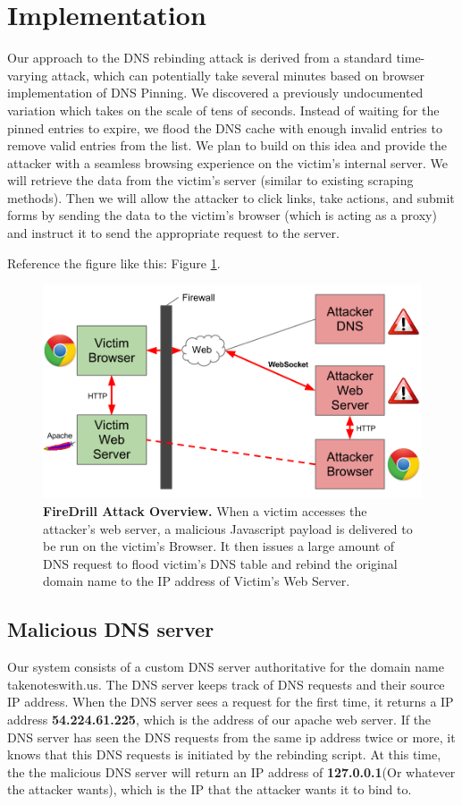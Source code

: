 \section{Implementation}
\label{sec:impl}
Our approach to the DNS rebinding attack is derived from a standard time-varying attack, which can potentially take several minutes based on browser implementation of DNS Pinning. We discovered a previously undocumented variation which takes on the scale of tens of seconds. Instead of waiting for the pinned entries to expire, we flood the DNS cache with enough invalid entries to remove valid entries from the list. We plan to build on this idea and provide the attacker with a seamless browsing experience on the victim's internal server. We will retrieve the data from the victim's server (similar to existing scraping methods). Then we will allow the attacker to click links, take actions, and submit forms by sending the data to the victim's browser (which is acting as a proxy) and instruct it to send the appropriate request to the server.

Reference the figure like this: Figure \ref{fig:firedrill1}.

\begin{figure}[h]
\centering
\includegraphics[width=0.8\columnwidth]{firedrill1.png}
\caption{\textbf{FireDrill Attack Overview.} When a victim accesses the attacker's web server, a malicious Javascript payload is delivered to be run on the victim's Browser. It then issues a large amount of DNS request to flood victim's DNS table and rebind the original domain name to the IP address of Victim's Web Server.}
\label{fig:firedrill1}
\end{figure}

\subsection{Malicious DNS server}
Our system consists of a custom DNS server authoritative for the domain name takenoteswith.us. The DNS server keeps track of DNS requests and their source IP address. When the DNS server sees a request for the first time, it returns a IP address \textbf{54.224.61.225}, which is the address of our apache web server. If the DNS server has seen the DNS requests from the same ip address twice or more, it knows that this DNS requests is initiated by the rebinding script. At this time, the the malicious DNS server will return an IP address of \textbf{127.0.0.1}(Or whatever the attacker wants), which is the IP that the attacker wants it to bind to.

